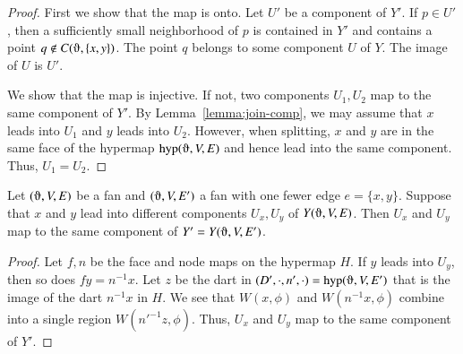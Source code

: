 \begin{proof}
First we show that the map is onto.  Let $U'$
be a component of $Y'$.  If $p\in U'$,
then a sufficiently small neighborhood of $p$ is contained
in $Y'$ and contains a point $q\not\in C(\orgn,\{x,y\})$.  The
point $q$ belongs to some component $U$ of $Y$.  The image
of $U$ is $U'$.

We show that the map is injective.  If not, two
components $U_1,U_2$ map to the same component of $Y'$.
By Lemma~\ref{lemma:join-comp}, we may assume
that $x$ leads into $U_1$ and
$y$ leads into $U_2$.
However, when splitting, $x$ and $y$ are in the same face of
the hypermap $\op{hyp}(\orgn,V,E)$ and hence lead into the
same component.  Thus, $U_1=U_2$.
\end{proof}

%
%

\begin{lemma} 
Let $(\orgn,V,E)$ be a fan and $(\orgn,V,E')$
a fan with one fewer edge $e = \{x,y\}$.  
Suppose that $x$ and $y$ lead into different components $U_x,U_y$
of $Y(\orgn,V,E)$.
Then $U_x$ and $U_y$ map to the same component of $Y'=Y(\orgn,V,E')$.
\end{lemma}

\begin{proof}
Let $f,n$ be the face and node maps on the hypermap
$H$.
If $y$ leads into $U_y$, then so does
$f y = n^{-1} x$.  Let $z$ be the dart in
$(D',\cdot,n',\cdot)=\op{hyp}(\orgn,V,E')$ that is the image of the dart $n^{-1}x$
in $H$. We see that
$W(x,\phi)$ and $W(n^{-1} x,\phi)$ combine into a single
region $W({n'}^{-1}z,\phi)$.  Thus, $U_x$ and $U_y$ map to the
same component of $Y'$.
\end{proof}

